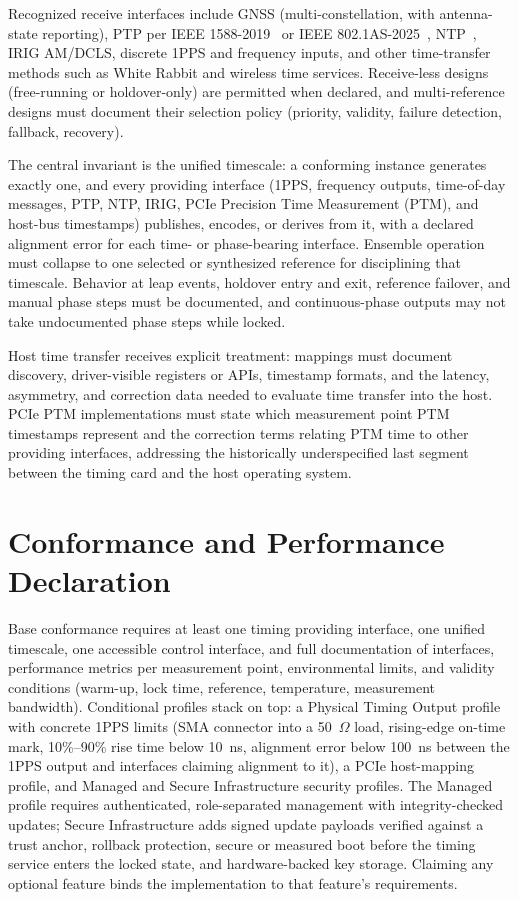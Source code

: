 \documentclass[conference,a4paper]{IEEEtran}
\begin{document}
Recognized receive interfaces include GNSS (multi-constellation, with
antenna-state reporting), PTP per IEEE 1588-2019~\cite{ieee1588} or IEEE
802.1AS-2025~\cite{ieee8021as}, NTP~\cite{rfc5905}, IRIG AM/DCLS, discrete
1PPS and frequency inputs, and other time-transfer methods such as White
Rabbit and wireless time services. Receive-less designs (free-running or
holdover-only) are permitted when declared, and multi-reference designs
must document their selection policy (priority, validity, failure
detection, fallback, recovery).

The central invariant is the unified timescale: a conforming instance
generates exactly one, and every providing interface (1PPS, frequency
outputs, time-of-day messages, PTP, NTP, IRIG, PCIe Precision Time
Measurement (PTM), and host-bus timestamps) publishes, encodes, or derives
from it, with a declared alignment error for each time- or phase-bearing
interface. Ensemble operation must collapse to one selected or synthesized
reference for disciplining that timescale. Behavior at
leap events, holdover entry and exit, reference failover, and manual phase steps
must be documented, and continuous-phase outputs may not take undocumented
phase steps while locked.

Host time transfer receives explicit treatment: mappings must document
discovery, driver-visible registers or APIs, timestamp formats, and the
latency, asymmetry, and correction data needed to evaluate time transfer
into the host. PCIe PTM implementations must
state which measurement point PTM timestamps represent and the correction
terms relating PTM time to other providing interfaces, addressing the
historically underspecified last segment between the timing card and the
host operating system.

\section{Conformance and Performance Declaration}
Base conformance requires at least one timing providing interface, one
unified timescale, one accessible control interface, and full documentation
of interfaces, performance metrics per measurement point, environmental
limits, and validity conditions (warm-up, lock time, reference,
temperature, measurement bandwidth). Conditional profiles
stack on top: a Physical Timing Output profile with concrete 1PPS limits
(SMA connector into a 50~$\Omega$ load, rising-edge on-time mark,
10\%--90\% rise time below 10~ns, alignment error below 100~ns between the
1PPS output and interfaces claiming alignment to it), a PCIe host-mapping
profile, and Managed and Secure Infrastructure security profiles. The
Managed profile requires authenticated, role-separated management with
integrity-checked updates; Secure Infrastructure adds signed update
payloads verified against a trust anchor, rollback protection, secure or
measured boot before the timing service enters the locked state, and
hardware-backed key storage. Claiming any optional feature binds the
implementation to that feature's requirements.
\end{document}
